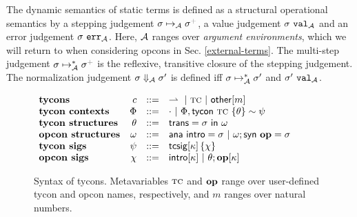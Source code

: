 \documentclass[10pt,preprint]{sigplanconf}
\newcommand{\moutput}{^{\color{gray}+}}
\begin{document}
The dynamic semantics of static terms is defined as a structural operational semantics by a stepping judgement $\sstep{\st}{\argEnv}{\st\moutput}$, a value judgement $\sigma~\mathtt{val}_{\mathcal{A}}$ and an error judgement $\sigma~\mathtt{err}_{\mathcal{A}}$. Here, $\mathcal{A}$ ranges over \emph{argument environments}, which we will  return to when considering opcons in Sec. \ref{external-terms}. The multi-step judgement $\smanystep{\st}{\argEnv}{\st\moutput}$ is the reflexive, transitive closure of the stepping judgement. The normalization judgement $\sigma \Downarrow_{\mathcal{A}} \sigma'$ is defined iff $\sigma \mapsto_{\mathcal{A}}^{*} \sigma'$ and $\sigma'~\mathtt{val}_{\mathcal{A}}$. %
\begin{figure}[t]
\small
$\begin{array}{lrcl}
\textbf{tycons} & c & ::= & \rightharpoonup ~|~ \tc ~|~ \keyw{other}[m]\\
\textbf{tycon contexts} & \Phi & ::= & \cdot ~|~ \Phi, \tcdef{\tc}{\psi}{\theta}\\
\textbf{tycon structures} & \theta & ::= & \tcstruct{\st}{\omega} \\
\textbf{opcon structures} & \omega & ::= & \tcstructn{\st} ~|~ \tcstructc{\omega}{op}{\st}\\
\textbf{tycon sigs} & \psi & ::= & \tcsig{\kappa}{\chi}\\
\textbf{opcon sigs}& \chi & ::= & \introsig{\kappa} ~|~ \opsigS{\theta}{op}{\kappa}\\
\end{array}\vspace{-3px}$
\caption{Syntax of tycons. Metavariables $\textsc{tc}$ and $\textbf{op}$ range over user-defined tycon and opcon names, respectively, and $m$ ranges over natural numbers.}
\label{syntax-TC}\vspace{-8px}
\end{figure}
\end{document}
